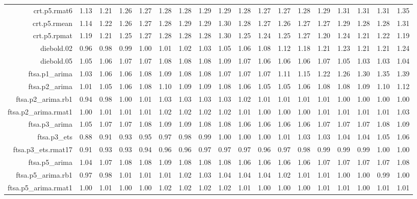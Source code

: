 \begin{tabular}{rrrrrrrrrrrrrrrrrr}
  crt.p5.rmat6 & 1.13 & 1.21 & 1.26 & 1.27 & 1.28 & 1.28 & 1.29 & 1.29 & 1.28 & 1.27 & 1.27 & 1.28 & 1.29 & 1.31 & 1.31 & 1.31 & 1.35 \\ 
  crt.p5.rmean & 1.14 & 1.22 & 1.26 & 1.27 & 1.28 & 1.29 & 1.29 & 1.30 & 1.28 & 1.27 & 1.26 & 1.27 & 1.27 & 1.29 & 1.28 & 1.28 & 1.31 \\ 
  crt.p5.rpmat & 1.19 & 1.21 & 1.25 & 1.27 & 1.28 & 1.28 & 1.28 & 1.30 & 1.25 & 1.24 & 1.25 & 1.27 & 1.20 & 1.24 & 1.21 & 1.22 & 1.19 \\ 
  diebold.02 & 0.96 & 0.98 & 0.99 & 1.00 & 1.01 & 1.02 & 1.03 & 1.05 & 1.06 & 1.08 & 1.12 & 1.18 & 1.21 & 1.23 & 1.21 & 1.21 & 1.24 \\ 
  diebold.05 & 1.05 & 1.06 & 1.07 & 1.07 & 1.08 & 1.08 & 1.08 & 1.09 & 1.07 & 1.06 & 1.06 & 1.06 & 1.07 & 1.05 & 1.03 & 1.03 & 1.04 \\ 
  ftsa.p1\_arima & 1.03 & 1.06 & 1.06 & 1.08 & 1.09 & 1.08 & 1.08 & 1.07 & 1.07 & 1.07 & 1.11 & 1.15 & 1.22 & 1.26 & 1.30 & 1.35 & 1.39 \\ 
  ftsa.p2\_arima & 1.01 & 1.05 & 1.06 & 1.08 & 1.10 & 1.09 & 1.09 & 1.08 & 1.06 & 1.05 & 1.05 & 1.06 & 1.08 & 1.08 & 1.09 & 1.10 & 1.12 \\ 
  ftsa.p2\_arima.rb1 & 0.94 & 0.98 & 1.00 & 1.01 & 1.03 & 1.03 & 1.03 & 1.03 & 1.02 & 1.01 & 1.01 & 1.01 & 1.01 & 1.00 & 1.00 & 1.00 & 1.00 \\ 
  ftsa.p2\_arima.rmat1 & 1.00 & 1.01 & 1.01 & 1.01 & 1.02 & 1.02 & 1.02 & 1.02 & 1.01 & 1.00 & 1.00 & 1.00 & 1.01 & 1.01 & 1.01 & 1.01 & 1.03 \\ 
  ftsa.p3\_arima & 1.05 & 1.07 & 1.07 & 1.08 & 1.09 & 1.09 & 1.08 & 1.08 & 1.06 & 1.06 & 1.06 & 1.06 & 1.07 & 1.07 & 1.07 & 1.08 & 1.09 \\ 
  ftsa.p3\_ets & 0.88 & 0.91 & 0.93 & 0.95 & 0.97 & 0.98 & 0.99 & 1.00 & 1.00 & 1.00 & 1.01 & 1.03 & 1.03 & 1.04 & 1.04 & 1.05 & 1.06 \\ 
  ftsa.p3\_ets.rmat17 & 0.91 & 0.93 & 0.93 & 0.94 & 0.96 & 0.96 & 0.97 & 0.97 & 0.97 & 0.96 & 0.97 & 0.98 & 0.99 & 0.99 & 0.99 & 1.00 & 1.00 \\ 
  ftsa.p5\_arima & 1.04 & 1.07 & 1.08 & 1.08 & 1.09 & 1.08 & 1.08 & 1.08 & 1.06 & 1.06 & 1.06 & 1.06 & 1.07 & 1.07 & 1.07 & 1.07 & 1.08 \\ 
  ftsa.p5\_arima.rb1 & 0.97 & 0.98 & 1.01 & 1.01 & 1.01 & 1.02 & 1.03 & 1.04 & 1.04 & 1.04 & 1.02 & 1.01 & 1.01 & 1.00 & 1.00 & 0.99 & 1.00 \\ 
  ftsa.p5\_arima.rmat1 & 1.00 & 1.01 & 1.00 & 1.00 & 1.02 & 1.02 & 1.02 & 1.02 & 1.01 & 1.00 & 1.00 & 1.00 & 1.01 & 1.01 & 1.00 & 1.01 & 1.01 \\ 

\end{tabular}
